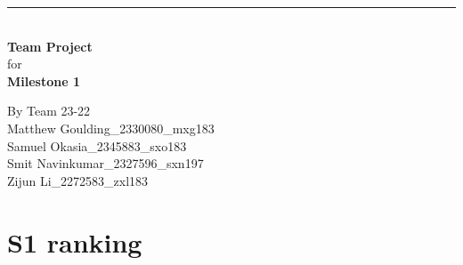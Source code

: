\documentclass[a4paper]{article}
\begin{document}

\begin{titlepage}
	
	\rule{\linewidth}{5pt}
	\raggedleft
	\fontsize{38pt}{50pt}\selectfont
    \textbf{\\Team Project\\}
    \fontsize{28pt}{60pt}\selectfont 
    for\\
    \fontsize{38pt}{60pt}\selectfont 
    \textbf{Milestone 1\\}
	
	\vfill %
	
	
	\parbox[t]{0.93\textwidth}{ %
		\raggedleft %
		\large %
		{\Large By Team 23-22}\\[4pt] %
		Matthew Goulding\_2330080\_mxg183\\
		Samuel Okasia\_2345883\_sxo183\\
		Smit Navinkumar\_2327596\_sxn197\\
		Zijun Li\_2272583\_zxl183\\
	}
	
\end{titlepage}

\begin{center}
	\tableofcontents
\end{center}
\newpage

\section{S1 ranking}
\end{document}
